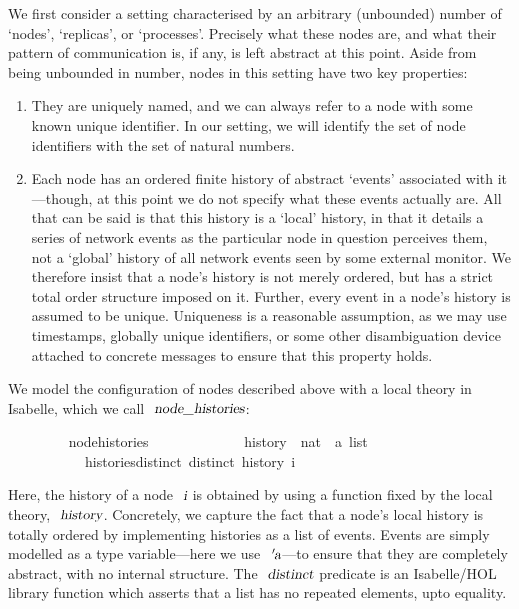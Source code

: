 \documentclass[acmlarge,review,anonymous]{acmart}\settopmatter{printfolios=true}
\begin{document}
We first consider a setting characterised by an arbitrary (unbounded) number of `nodes', `replicas', or `processes'.
Precisely what these nodes are, and what their pattern of communication is, if any, is left abstract at this point.
Aside from being unbounded in number, nodes in this setting have two key properties:
\begin{enumerate}
\item
They are uniquely named, and we can always refer to a node with some known unique identifier.
In our setting, we will identify the set of node identifiers with the set of natural numbers.
\item
Each node has an ordered finite history of abstract `events' associated with it---though, at this point we do not specify what these events actually are.
All that can be said is that this history is a `local' history, in that it details a series of network events as the particular node in question perceives them, not a `global' history of all network events seen by some external monitor.
We therefore insist that a node's history is not merely ordered, but has a strict total order structure imposed on it.
Further, every event in a node's history is assumed to be unique.
Uniqueness is a reasonable assumption, as we may use timestamps, globally unique identifiers, or some other disambiguation device attached to concrete messages to ensure that this property holds.
\end{enumerate}
We model the configuration of nodes described above with a local theory in Isabelle, which we call $\isa{node{\isacharunderscore}histories}$:
\\
\begin{isabellebody}
\ \ \ \ \ \ \ \  node{\isacharunderscore}histories\ {\isacharequal}\ \isanewline
\ \ \ \ \ \ \ \ \ \ \ history\ {\isacharcolon}{\isacharcolon}\ {\isachardoublequoteopen}nat\ {\isasymRightarrow}\ {\isacharprime}a\ list{\isachardoublequoteclose}\isanewline
\ \ \ \ \ \ \ \ \ \ \ histories{\isacharunderscore}distinct{\isacharcolon}\ {\isachardoublequoteopen}distinct\ {\isacharparenleft}history\ i{\isacharparenright}{\isachardoublequoteclose}
\end{isabellebody}
\vspace{\baselineskip}
Here, the history of a node $\isa{i}$ is obtained by using a function fixed by the local theory, $\isa{history}$.
Concretely, we capture the fact that a node's local history is totally ordered by implementing histories as a list of events.
Events are simply modelled as a type variable---here we use $\isa{{\isacharprime}a}$---to ensure that they are completely abstract, with no internal structure.
The $\isa{distinct}$ predicate is an Isabelle/HOL library function which asserts that a list has no repeated elements, upto equality.
\end{document}
